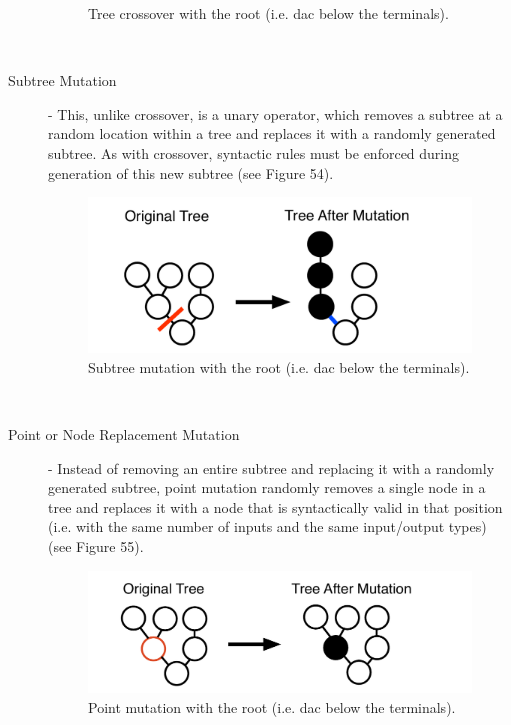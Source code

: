\documentclass[12pt]{report} 	%
\numberwithin{figure}{chapter}
\numberwithin{table}{chapter}
\numberwithin{equation}{chapter}
\begin{document}
\begin{flushleft}
\begin{description}
\begin{figure}[h!]
\begin{center}
\caption[Crossover]{Tree crossover with the root (i.e. dac\texttildelow{} below the terminals).}
\end{center}
\end{figure}
\\
\item[Subtree Mutation] - This, unlike crossover, is a unary operator, which removes a subtree at a random location within a tree and replaces it with a randomly generated subtree. As with crossover, syntactic rules must be enforced during generation of this new subtree (see Figure 54).
\begin{figure}[h!]
\begin{center}
\includegraphics[scale=0.5]{SubtreeMutation}
\caption[Subtree mutation]{Subtree mutation with the root (i.e. dac\texttildelow{} below the terminals).}
\end{center}
\end{figure}
\\
\item[Point or Node Replacement Mutation] - Instead of removing an entire subtree and replacing it with a randomly generated subtree, point mutation randomly removes a single node in a tree and replaces it with a node that is syntactically valid in that position (i.e. with the same number of inputs and the same input/output types) (see Figure 55).
\begin{figure}[h!]
\begin{center}
\includegraphics[scale=0.5]{PointMutation}
\caption[Point mutation]{Point mutation with the root (i.e. dac\texttildelow{} below the terminals).}

\end{center}
\end{figure}
\end{description}
\end{flushleft}
\end{document}
